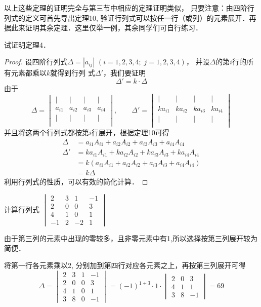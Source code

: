 以上这些定理的证明完全与第三节中相应的定理证明类似，
只要注意：由四阶行列式的定义可首先导出定理10, 验证行列式可以按任一行（或列）的元素展开．再据此来证明其余定理．这里仅举一例，其余同学们可自行练习．



\begin{example}
试证明定理4．
\end{example}

\begin{proof}
    设四阶行列式$\Delta=|a_{ij}|$ $(i=1, 2, 3, 4;\; 
j=1, 2, 3, 4)$，
并设$\Delta$的第$i$行的所有元素都乘以$k$就得到行列
式$\Delta'$，我们要证明
\[\Delta'=k\cdot \Delta\]
由于
\[\Delta =\begin{vmatrix}
|&|&|&|\\
a_{i1}&a_{i2}&a_{i3}&a_{i4}\\
|&|&|&|\\ 
\end{vmatrix},\qquad \Delta' =\begin{vmatrix}
|&|&|&|\\
ka_{i1}&ka_{i2}&ka_{i3}&ka_{i4}\\
|&|&|&|\\ 
\end{vmatrix}\]
并且将这两个行列式都按第$i$行展开，根据定理10可得
\[\begin{split}
\Delta &= a_{i1}A_{i1}+a_{i2}A_{i2}+ a_{i3}A_{i3}+a_{i4}A_{i4} \\
\Delta'&= ka_{i1}A_{i1}+ka_{i2}A_{i2}+ ka_{i3}A_{i3}+ka_{i4}A_{i4}\\
&=k(a_{i1}A_{i1}+a_{i2}A_{i2}+ a_{i3}A_{i3}+a_{i4}A_{i4})\\
&=k\Delta
\end{split}\]
利用行列式的性质，可以有效的简化计算．
\end{proof}

\begin{example}
计算行列式
$\begin{vmatrix}
    2&3&1&-1\\2&0&0&3\\
    4&1&0&1\\-1&2&-2&1
\end{vmatrix}$
\end{example}

\begin{analyze}
由于第三列的元素中出现的零较多，且非零元素中有1,所以选择按第三列展开较为简便．
\end{analyze}

\begin{solution}
将第一行各元素乘以2, 分别加到第四行对应各元素之上，再按第三列展开可得     
\[\Delta=\begin{vmatrix}
    2&3&1&-1\\
    2&0&0&3\\
    4&1&0&1\\
    3&8&0&-1
\end{vmatrix}=(-1)^{1+3}\cdot 1\cdot \begin{vmatrix}
    2&0&3\\4&1&1\\3&8&-1
\end{vmatrix}=69\]
\end{solution}

